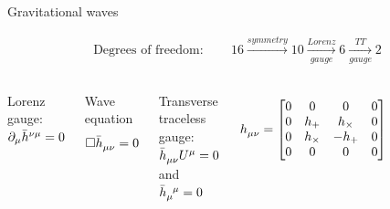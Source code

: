 \documentclass[pdf]{beamer}
\begin{document}
\begin{frame}{Gravitational waves}

	\begin{align*}
	\text{Degrees of freedom}: \qquad 16 \xrightarrow{symmetry} 10 \xrightarrow[gauge]{Lorenz} 6 \xrightarrow[gauge]{TT} 2
	\end{align*}		
		
	\begin{columns}
	\hspace{.5cm}	
	Lorenz gauge: $\partial_\mu \tensor{\bar{h}}{^\nu^\mu} = 0$
	\begin{block}{Wave equation}
	\begin{equation*}
	\Box \tensor{\bar{h}}{_\mu_\nu} = 0
	\end{equation*}		
	\end{block}
	

	
	Transverse traceless gauge: $\tensor{\bar{h}}{_\mu_\nu} U^\mu = 0$ and $\tensor{\bar{h}}{_\mu^\mu} = 0$
	
	\begin{equation*}
	\tensor{h}{_\mu_\nu} = \begin{bmatrix}
	0&0&0&0\\
	0&h_+&h_\times&0\\
	0&h_\times&-h_+&0\\
	0&0&0&0
	\end{bmatrix}
	\end{equation*}		
	
\begin{figure}
\end{figure}		
	
	\end{columns}

\end{frame}
\end{document}
